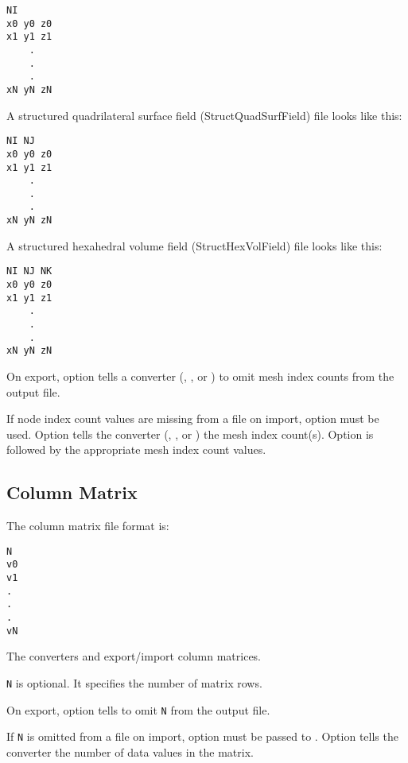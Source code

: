 \begin{verbatim}
NI
x0 y0 z0
x1 y1 z1
    .
    .
    .
xN yN zN
\end{verbatim}

A structured quadrilateral surface field
(StructQuadSurfField)  file looks like this:

\begin{verbatim}
NI NJ
x0 y0 z0
x1 y1 z1
    .
    .
    .
xN yN zN
\end{verbatim}

A structured hexahedral volume field (StructHexVolField)
 file looks like this:

\begin{verbatim}
NI NJ NK
x0 y0 z0
x1 y1 z1
    .
    .
    .
xN yN zN
\end{verbatim}

On export, option  tells a converter
(, , or
) to omit mesh index counts
from the output file.

If node index count values are missing from a file on import, option
 must be used.  Option  tells the
converter (,
, or
) the mesh index count(s).  Option
 is followed by the appropriate mesh index count
values.

\subsection{Column Matrix}
\label{sec:colmat}

The column matrix file format is:

\begin{verbatim}
N
v0 
v1
.
.
.
vN
\end{verbatim}

The converters  and  
export/import column matrices.

\verb|N| is optional.  It specifies the number of matrix rows.  

On export, option  tells
 to omit \verb|N| from the output file.

If \verb|N| is omitted from a file on import, option
 must be passed to .
Option  tells the converter the number of data
values in the matrix.

